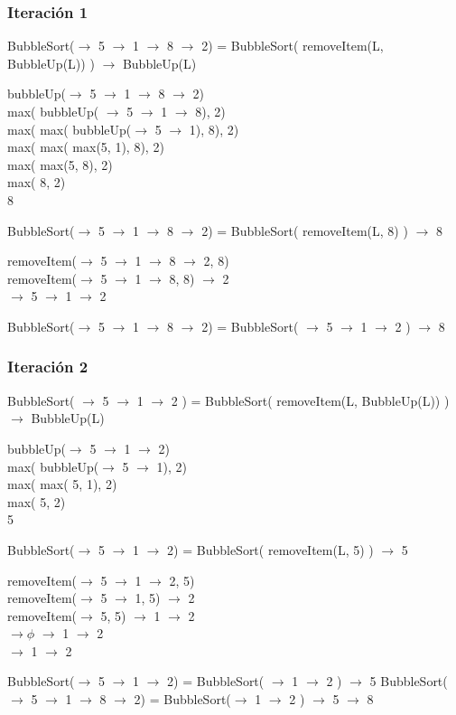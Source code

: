 \subsubsection{Iteración 1}
 BubbleSort($\to$ 5 $\to$ 1 $\to$ 8 $\to$ 2) = BubbleSort( removeItem(L, BubbleUp(L)) ) $\to$ BubbleUp(L)
 \begin{center}
    bubbleUp($\to$ 5 $\to$ 1 $\to$ 8 $\to$ 2)\\
    max( bubbleUp( $\to$ 5 $\to$ 1 $\to$ 8), 2)\\
    max( max( bubbleUp($\to$ 5 $\to$ 1), 8), 2)\\
    max( max( max(5, 1), 8), 2)\\
    max( max(5, 8), 2)\\
    max( 8, 2)\\
    8\\
 \end{center}
 BubbleSort($\to$ 5 $\to$ 1 $\to$ 8 $\to$ 2) = BubbleSort( removeItem(L, 8) ) $\to$ 8
 \begin{center}
    removeItem($\to$ 5 $\to$ 1 $\to$ 8 $\to$ 2, 8)\\
    removeItem($\to$ 5 $\to$ 1 $\to$ 8, 8) $\to$ 2\\
    $\to$ 5 $\to$ 1 $\to$ 2\\
 \end{center}
 BubbleSort($\to$ 5 $\to$ 1 $\to$ 8 $\to$ 2) = BubbleSort( $\to$ 5 $\to$ 1 $\to$ 2 ) $\to$ 8

\subsubsection{Iteración 2}
 BubbleSort( $\to$ 5 $\to$ 1 $\to$ 2 ) = BubbleSort( removeItem(L, BubbleUp(L)) ) $\to$ BubbleUp(L)
 \begin{center}
   bubbleUp($\to$ 5 $\to$ 1 $\to$ 2)\\
   max( bubbleUp($\to$ 5 $\to$ 1), 2)\\
   max( max( 5, 1), 2)\\
   max( 5, 2)\\
   5\\
 \end{center}
 BubbleSort($\to$ 5 $\to$ 1 $\to$ 2) = BubbleSort( removeItem(L, 5) ) $\to$ 5
 \begin{center}
    removeItem($\to$ 5 $\to$ 1 $\to$ 2, 5)\\
    removeItem($\to$ 5 $\to$ 1, 5) $\to$ 2\\
    removeItem($\to$ 5, 5) $\to$ 1 $\to$ 2\\
    $\to\phi$ $\to$ 1 $\to$ 2\\
    $\to$ 1 $\to$ 2\\
 \end{center}
 BubbleSort($\to$ 5 $\to$ 1 $\to$ 2) = BubbleSort( $\to$ 1 $\to$ 2 ) $\to$ 5\newline
 BubbleSort($\to$ 5 $\to$ 1 $\to$ 8 $\to$ 2) = BubbleSort($\to$ 1 $\to$ 2 ) $\to$ 5 $\to$ 8
 
